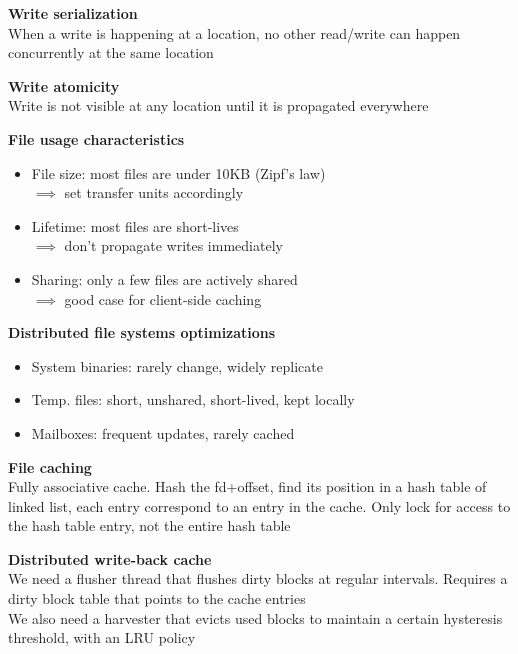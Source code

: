 \documentclass[10pt,letterpaper,landscape]{report}
\newcommand{\boxheight}{21.59cm}
\newcommand{\boxwidth}{8.85cm}
\begin{document}
\begin{small}
{\begin{minipage}[t][\boxheight][c]{\boxwidth}
    \textbf{Write serialization}\\
    When a write is happening at a location, no other read/write can happen concurrently at the same location
    
    \textbf{Write atomicity}\\
    Write is not visible at any location until it is propagated everywhere
    
    \textbf{File usage characteristics}
    \begin{itemize}
        \item File size: most files are under 10KB (Zipf's law)\\
        $\implies$ set transfer units accordingly
        \item Lifetime: most files are short-lives\\
        $\implies$ don't propagate writes immediately
        \item Sharing: only a few files are actively shared\\
        $\implies$ good case for client-side caching
    \end{itemize}
    
    \textbf{Distributed file systems optimizations}
    \begin{itemize}
        \item System binaries: rarely change, widely replicate
        \item Temp. files: short, unshared, short-lived, kept locally
        \item Mailboxes: frequent updates, rarely cached
    \end{itemize}
    
    \textbf{File caching}\\
    Fully associative cache. Hash the fd+offset, find its position in a hash table of linked list, each entry correspond to an entry in the cache. Only lock for access to the hash table entry, not the entire hash table
    
    \textbf{Distributed write-back cache}\\
    We need a flusher thread that flushes dirty blocks at regular intervals. Requires a dirty block table that points to the cache entries\\
    We also need a harvester that evicts used blocks to maintain a certain hysteresis threshold, with an LRU policy
    
    
\end{minipage}
}\fbox{
\begin{minipage}[t][\boxheight][c]{\boxwidth}

    TODO
    
\end{minipage}
}\fbox{
\begin{minipage}[t][\boxheight][c]{\boxwidth}


	TODO



\end{minipage}
}
\end{small}
\end{document}
